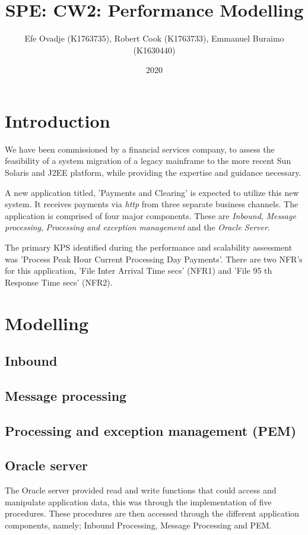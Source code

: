 \documentclass[a4paper,11pt]{report}
\title{SPE: CW2: Performance Modelling}
\author{Efe Ovadje (K1763735), Robert Cook (K1763733), Emmanuel Buraimo (K1630440)}
\date{2020}
\begin{document}
\maketitle

\chapter*{Introduction}
We have been commissioned
by a financial services company,
to assess the feasibility of a system migration of a
legacy mainframe to the more recent Sun Solaris and
J2EE platform, while providing the expertise and guidance necessary.

A new application titled, 'Payments and Clearing' is expected to
utilize this new system.
It receives payments via \textit{http} from three separate business channels.
The application is comprised of four major components.
These are \textit{Inbound}, \textit{Message processing},
\textit{Processing and exception management} and the \textit{Oracle Server}.

The primary KPS identified during the performance and
scalability assessment was 'Process Peak Hour Current Processing Day Payments'.
There are two NFR's for this application,
'File Inter Arrival Time secs' (NFR1) and
'File 95 th Response Time secs' (NFR2).

\chapter*{Modelling}

\section*{Inbound}

\section*{Message processing}

\section*{Processing and exception management (PEM)}

\section*{Oracle server}
The Oracle server provided read and write functions that could access and manipulate application data, this was through the implementation of five procedures. These procedures are then accessed through the different application components, namely; Inbound Processing, Message Processing and PEM.\linebreak
\end{document}
